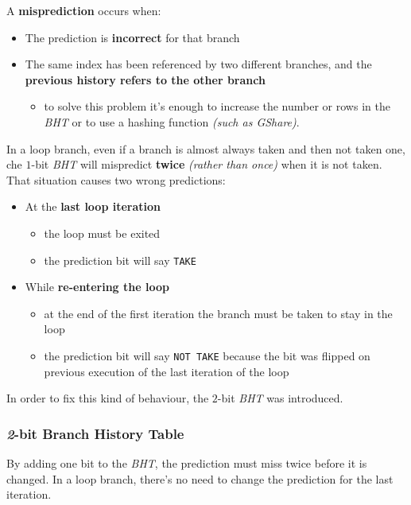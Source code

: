 \documentclass[english]{article}
\begin{document}
A \textbf{misprediction} occurs when:

\begin{itemize}
  \item The prediction is \textbf{incorrect} for that branch
  \item The same index has been referenced by two different branches, and the \textbf{previous history refers to the other branch}
        \begin{itemize}
          \item to solve this problem it's enough to increase the number or rows in the \textit{BHT} or to use a hashing function \textit{(such as  GShare)}.
        \end{itemize}
\end{itemize}

\bigskip
In a loop branch, even if a branch is almost always taken and then not taken one, che \(1\)-bit \textit{BHT} will mispredict \textbf{twice} \textit{(rather than once)} when it is not taken.
That situation causes two wrong predictions:
\begin{itemize}
  \item At the \textbf{last loop iteration}
        \begin{itemize}
          \item the loop must be exited
          \item the prediction bit will say \texttt{TAKE}
        \end{itemize}
  \item While \textbf{re-entering the loop}
        \begin{itemize}
          \item at the end of the first iteration the branch must be taken to stay in the loop
          \item the prediction bit will say \texttt{NOT TAKE} because the bit was flipped on previous execution of the last iteration of the loop
        \end{itemize}
\end{itemize}

In order to fix this kind of behaviour, the \(2\)-bit \textit{BHT} was introduced.

\subsubsection{\textit{2}-bit Branch History Table}

By adding one bit to the \textit{BHT}, the prediction must miss twice before it is changed.
In a loop branch, there's no need to change the prediction for the last iteration.
\end{document}

